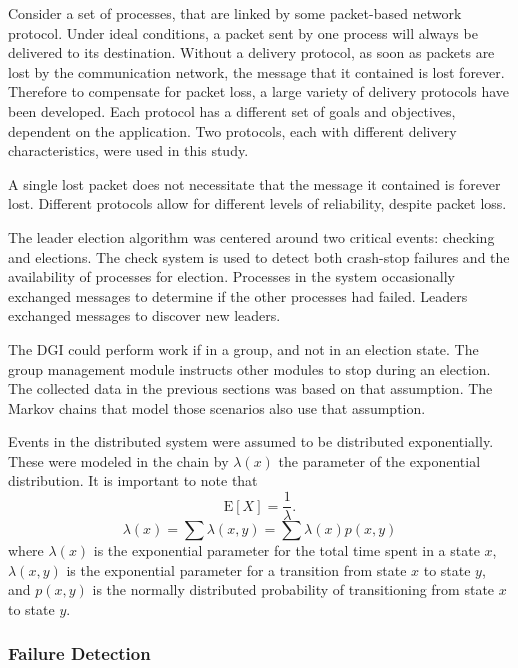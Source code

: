 Consider a set of processes, that are linked by some packet-based network protocol.
Under ideal conditions, a packet sent by one process  will always be delivered to its destination.
Without a delivery protocol, as soon as packets are lost by the communication network, the message that it contained is lost forever.
Therefore to compensate for packet loss, a large variety of delivery protocols have been developed.
Each protocol has a different set of goals and objectives, dependent on the application.
Two protocols, each with different delivery characteristics, were used in this study.

A single lost packet does not necessitate that the message it contained is forever lost.
Different protocols allow for different levels of reliability, despite packet loss.

The leader election algorithm was centered around two critical events: checking and elections.
The check system is used to detect both crash-stop failures and the availability of processes for election.
Processes in the system occasionally exchanged messages to determine if the other processes had failed.
Leaders exchanged messages to discover new leaders. 

The DGI could perform work if in a group, and not in an election state. 
The group management module instructs other modules to stop during an election.
The collected data in the previous sections was based on that assumption.
The Markov chains that model those scenarios also use that assumption.

Events in the distributed system were assumed to be distributed exponentially.
These were modeled in the chain by $\lambda(x)$ the parameter of the exponential distribution. \cite{MARKOV1}\cite{MARKOV2}
It is important to note that
\begin{equation}
\mathrm{E}[X] = \frac{1}{\lambda}. \!
\end{equation}
\begin{equation}
\lambda(x) = \sum \lambda(x,y) = \sum \lambda(x) p(x,y)
\end{equation}
where $\lambda(x)$ is the exponential parameter for the total time spent in a state $x$, $\lambda(x,y)$ is the exponential parameter for a transition from state $x$ to state $y$, and $p(x,y)$ is the normally distributed probability of transitioning from state $x$ to state $y$.

\subsubsection{Failure Detection}

